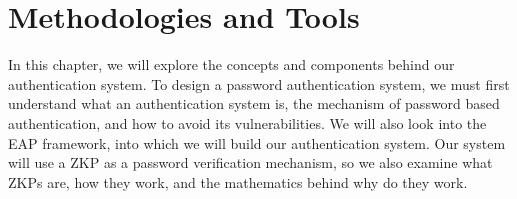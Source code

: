 \chapter{Methodologies and Tools}
\label{chapter:2}

\noindent
In this chapter, we will explore the concepts and components behind our authentication system.
To design a password authentication system, we must first understand what an authentication system is, the mechanism of password based authentication, and how to avoid its vulnerabilities.
We will also look into the EAP framework, into which we will build our authentication system.
Our system will use a ZKP as a password verification mechanism, so we also examine what ZKPs are, how they work, and the mathematics behind why do they work.